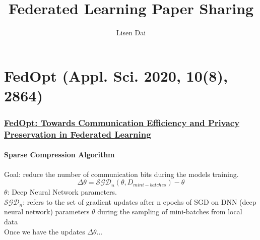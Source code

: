 \documentclass[10pt]{beamer}
\title{
    Federated Learning Paper Sharing 
}
\author{
    Lisen Dai
}
\begin{document}
    \maketitle

    \section*{
        FedOpt (Appl. Sci. 2020, 10(8), 2864)
    }
    \begin{frame}
        \frametitle{
            \href{https://www.mdpi.com/2076-3417/10/8/2864}{
            FedOpt: Towards Communication Efficiency and Privacy Preservation in Federated Learning
            }
        }
        \framesubtitle{Sparse Compression Algorithm}
        Goal: reduce the number of communication bits during the models training. \\
        $$
        \Delta\theta = \mathcal{SGD}_n (\theta, D_{mini-batches}) - \theta
        $$
        $\theta$: Deep Neural Network parameters. \\
        $\mathcal{SGD}_n$: refers to the set of gradient updates after n epochs of SGD on DNN (deep neural network) parameters $\theta$ during the sampling of mini-batches from local data \\
        
        Once we have the updates $\Delta \theta$... \\
        
    
    \end{frame}
\end{document}

